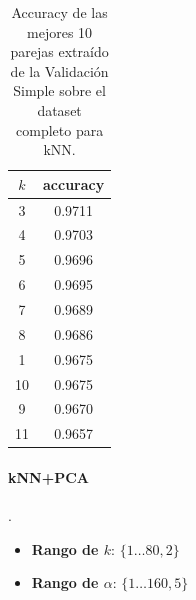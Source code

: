 \begin{table}[h!]
    \begin{center}
        \begin{tabular}{|c|c|}
        \hline
        \textbf{$k$} & \textbf{accuracy} \\
        \hline
        3 &  0.9711\\
        4 & 0.9703\\
        5 & 0.9696\\
        6 & 0.9695\\
        7 &  0.9689\\
        8 & 0.9686\\
        1 & 0.9675\\
        10 & 0.9675\\
        9 & 0.9670\\
        11 & 0.9657\\
        
        \hline
        \end{tabular}
        \caption{Accuracy de las mejores 10 parejas extraído de la Validación Simple sobre el dataset completo para kNN.}
        \label{knn_valSimple_table}
    \end{center}
\end{table}

\paragraph{kNN+PCA}.

\par
\begin{itemize}

    \item \textbf{Rango de $k$}: $\{1\dots80, 2\}$
    \item \textbf{Rango de $\alpha$}: $\{1\dots160, 5\}$

\end{itemize}

